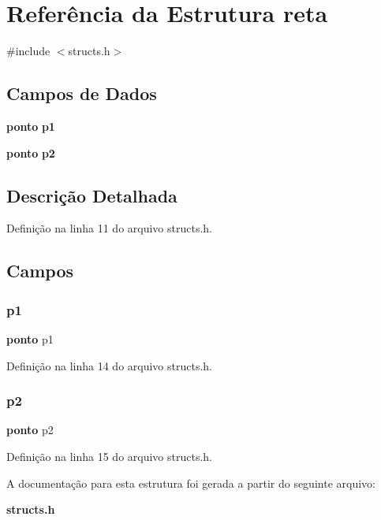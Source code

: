 \section{Referência da Estrutura reta}
\label{structreta}


{\ttfamily \#include $<$structs.\+h$>$}

\subsection*{Campos de Dados}
\begin{DoxyCompactItemize}
\item 
\textbf{ ponto} \textbf{ p1}
\item 
\textbf{ ponto} \textbf{ p2}
\end{DoxyCompactItemize}


\subsection{Descrição Detalhada}


Definição na linha 11 do arquivo structs.\+h.



\subsection{Campos}
\mbox{\label{structreta_a7e675d0c58d3b779ff9532f7f42339c2}} 
\subsubsection{p1}
{\footnotesize\ttfamily \textbf{ ponto} p1}



Definição na linha 14 do arquivo structs.\+h.

\mbox{\label{structreta_ad1ed4e875bde94fe133baa9fa9848bc1}} 
\subsubsection{p2}
{\footnotesize\ttfamily \textbf{ ponto} p2}



Definição na linha 15 do arquivo structs.\+h.



A documentação para esta estrutura foi gerada a partir do seguinte arquivo\+:\begin{DoxyCompactItemize}
\item 
\textbf{ structs.\+h}\end{DoxyCompactItemize}
